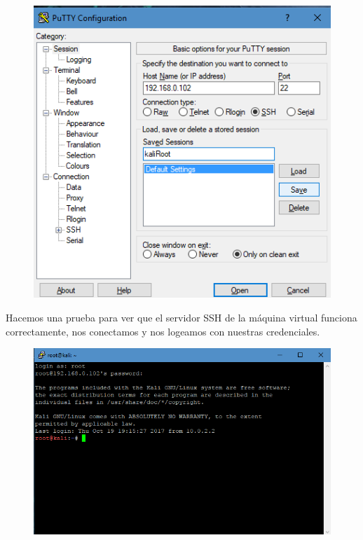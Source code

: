 \documentclass{article}
\begin{document}
\begin{figure}[H]
\centering
\includegraphics[width=1\textwidth]{08-GUARDARKALIPUTTY}
\end{figure}

Hacemos una prueba para ver que el servidor SSH de la m\'aquina virtual funciona correctamente, nos conectamos y nos logeamos con nuestras credenciales.

\begin{figure}[H]
\centering
\includegraphics[width=1\textwidth]{09-LOGEADOSSH}
\end{figure}
\end{document}

